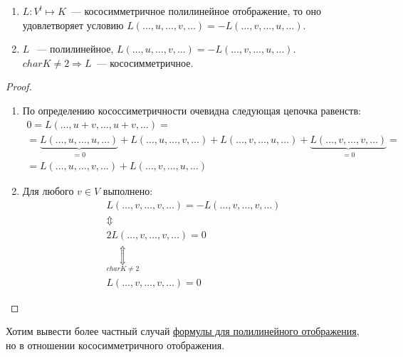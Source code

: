 \begin{statement}\leavevmode
    \begin{enumerate}
        \item
            $L: V^l\mapsto K$~--- кососимметричное полилинейное отображение, то
            оно удовлетворяет условию $L(\dots, u,\dots, v,\dots) = -L(\dots,v,\dots,u,\dots)$.
        \item 
            $L~$~--- полилинейное, $L(\dots, u,\dots,v,\dots) = -L(\dots, v,\dots, u,\dots)$.
            $char K \not= 2 \Rightarrow L$~--- кососимметричное.
    \end{enumerate}
\end{statement}
\begin{proof}\leavevmode\\
    \begin{enumerate}
        \item
            По определению кососсиметричности очевидна следующая цепочка равенств:
            \[
                \begin{gathered}
                    0 = L(\dots, u + v, \dots, u + v,\dots) =\\=
                    \underbrace{L(\dots, u,\dots, u,\dots)}_{=0} + L(\dots, u, \dots, v,\dots) + 
                    L(\dots, v,\dots,u,\dots)+\underbrace{L(\dots, v,\dots, v, \dots)}_{=0}=\\=
                    L(\dots, u,\dots, v,\dots) + L(\dots, v,\dots, u,\dots)
                \end{gathered}
            \]
        \item
            Для любого $v\in V$ выполнено:
            \[
                \begin{gathered}
                    L(\dots, v,\dots,v,\dots) = -L(\dots,v,\dots,v,\dots)
                    \\\Updownarrow\\
                    2L(\dots,v,\dots,v,\dots) = 0 
                    \\\underset{char K \not= 2}{\Updownarrow}\\
                    L(\dots, v,\dots,v,\dots) = 0
                \end{gathered}
            \]
    \end{enumerate}
\end{proof}
\begin{motivation}
    Хотим вывести более частный случай 
    \hyperref[eq:7:1]{формулы для полилинейного отображения}, 
    но в отношении кососимметричного отображения.
\end{motivation}
